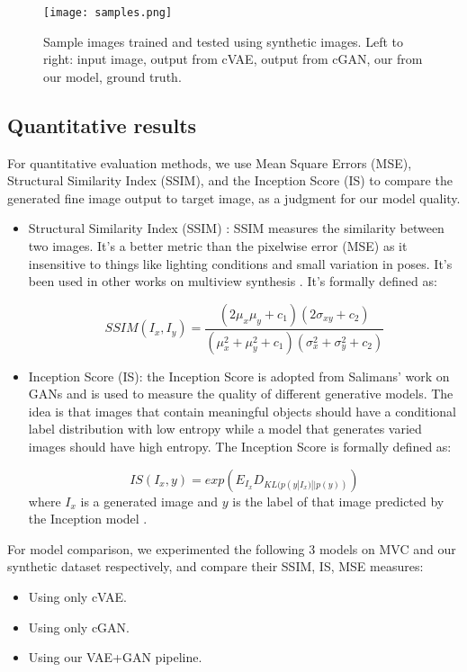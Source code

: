 \documentclass[10pt,conference]{IEEEtran}
\begin{document}
\begin{figure}[htbp]
\centering
\texttt{[image: samples.png]}
\caption{Sample images trained and tested using synthetic images. Left to right: input image, output from cVAE, output from cGAN, our from our model, ground truth.}
\end{figure}

\subsection{Quantitative results}

For quantitative evaluation methods, we use Mean Square Errors (MSE), Structural Similarity Index (SSIM), and the Inception Score (IS) to compare the generated fine image output to target image, as a judgment for our model quality.

\begin{itemize}
\item Structural Similarity Index (SSIM) \autocite{wang2004image}: SSIM measures the similarity between two images. It's a better metric than the pixelwise error (MSE) as it insensitive to things like lighting conditions and small variation in poses. It's been used in other works on multiview synthesis \autocite{park2017transformation, zhao2017multi}. It's formally defined as:

$$SSIM(I_x,I_y)=\frac{(2\mu_x \mu_y + c_1)(2\sigma_{xy}+c_2)}{(\mu_x^2+\mu_y^2 +c_1)(\sigma_x^2+\sigma_y^2+c_2)}$$

\item Inception Score (IS): the Inception Score is adopted from Salimans' work on GANs \autocite{salimans2016improved} and is used to measure the quality of different generative models. The idea is that images that contain meaningful objects should have a conditional label distribution with low entropy while a model that generates varied images should have high entropy. The Inception Score is formally defined as:

$$IS(I_x, y)=exp(E_{I_x}D_{KL(p(y|I_x) || p(y))})$$
where $I_x$ is a generated image and $y$ is the label of that image predicted by the Inception model \autocite{szegedy2015going}.

\end{itemize}

For model comparison, we experimented the following 3 models on MVC and our synthetic dataset respectively, and compare their SSIM, IS, MSE measures:

\begin{itemize}
\item Using only cVAE.
\item Using only cGAN.
\item Using our VAE+GAN pipeline.
\end{itemize}
\end{document}
